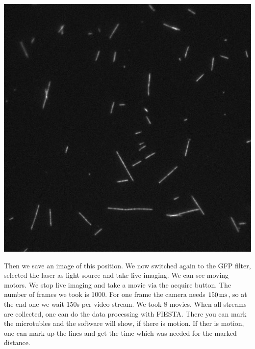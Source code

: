         \begin{center}
             \includegraphics[scale=0.4]{pic/exampleMT.jpeg}  
             \label{exp:mts}
        \end{center}
        Then we save an image of this position. We now switched again to the GFP filter, selected the laser as light source and take live imaging. We can see moving motors. We stop live imaging and take a movie via the acquire button. The number of frames we took is 1000. 
        For one frame the camera needs $\unit[150]{ms}$, so at the end one we wait 150s per video stream. We took 8 movies. 
        When all streams are collected, one can do the data processing with FIESTA. There you can mark the microtubles and the software will show, if there is motion. If ther is motion, one can mark up the lines and get the time which was needed for the marked distance.
